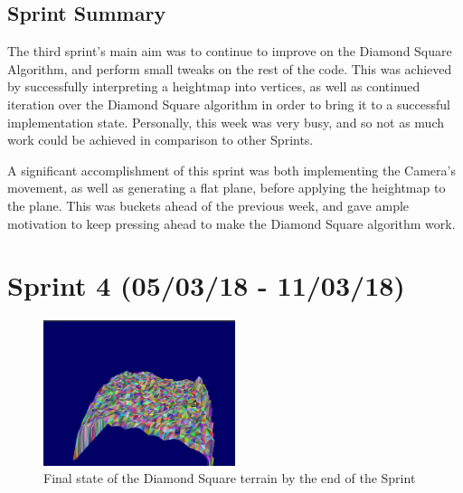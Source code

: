 \documentclass[a4paper,10pt]{report}
\begin{document}
\subsection{Sprint Summary}
The third sprint's main aim was to continue to improve on the Diamond Square Algorithm, and perform small tweaks on the rest of the code. This was achieved by successfully interpreting a heightmap into vertices, as well as continued iteration over the Diamond Square algorithm in order to bring it to a successful implementation state. Personally, this week was very busy, and so not as much work could be achieved in comparison to other Sprints. \medskip

A significant accomplishment of this sprint was both implementing the Camera's movement, as well as generating a flat plane, before applying the heightmap to the plane. This was buckets ahead of the previous week, and gave ample motivation to keep pressing ahead to make the Diamond Square algorithm work. 

\clearpage
\section{Sprint 4 (05/03/18 - 11/03/18)}

\begin{figure}[h!]
    \centering
  \includegraphics[width=0.5\textwidth]{Sprint4-7.png}
 \caption{Final state of the Diamond Square terrain by the end of the Sprint}
 \label{fig:sprint4-1}
\end{figure}
\end{document}

